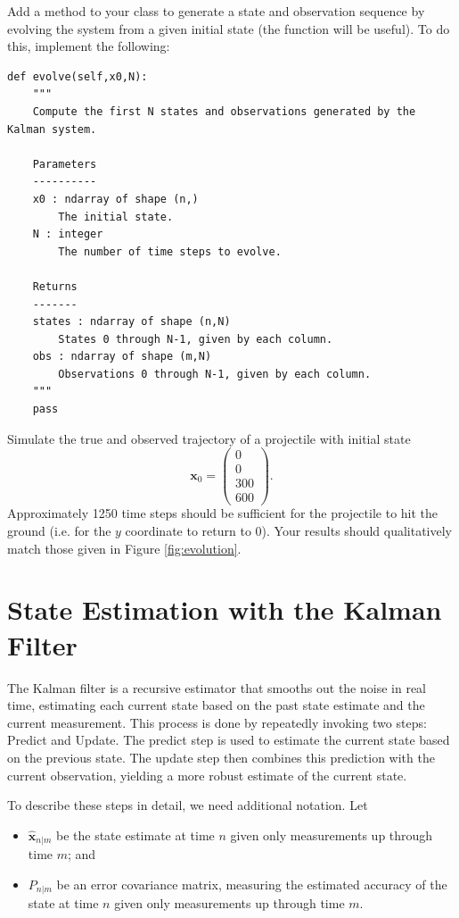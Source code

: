 \begin{problem}
Add a method to your  class to generate a state and observation sequence by evolving the system from a given initial state (the function  will be useful).
To do this, implement the following:
\begin{lstlisting}
def evolve(self,x0,N):
    """
    Compute the first N states and observations generated by the Kalman system.

    Parameters
    ----------
    x0 : ndarray of shape (n,)
        The initial state.
    N : integer
        The number of time steps to evolve.

    Returns
    -------
    states : ndarray of shape (n,N)
        States 0 through N-1, given by each column.
    obs : ndarray of shape (m,N)
        Observations 0 through N-1, given by each column.
    """
    pass
\end{lstlisting}

Simulate the true and observed trajectory of a projectile with initial state
\[
\mathbf{x}_0 = \left( \begin{array}{c} 0\\ 0 \\ 300 \\ 600\end{array} \right).
\]
Approximately 1250 time steps should be sufficient for the projectile to hit the ground (i.e. for the $y$ coordinate to return to 0).
Your results should qualitatively match those given in Figure \ref{fig:evolution}.
\label{prob:simulation}
\end{problem}



\section*{State Estimation with the Kalman Filter}
The Kalman filter is a recursive estimator that smooths out the noise in real time, estimating each current state based on the past state estimate and the current measurement.
This process is done by repeatedly invoking two steps: Predict and Update.
The predict step is used to estimate the current state based on the previous state.
The update step then combines this prediction with the current observation, yielding a more robust estimate of the current state.

To describe these steps in detail, we need additional notation. Let
\begin{itemize}
    \item $\widehat{\mathbf{x}}_{n|m}$ be the state estimate at time $n$ given only measurements up through time $m$; and
    \item $P_{n|m}$ be an error covariance matrix, measuring the estimated accuracy of the state at time $n$ given only measurements up through time $m$.
\end{itemize}

